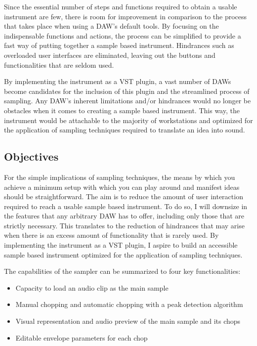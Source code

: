 \documentclass[12pt, a4paper, hidelinks]{article}
\begin{document}
	Since the essential number of steps and functions required to obtain a usable instrument are few, there is room for improvement in comparison to the process that takes place when using a DAW's default tools. By focusing on the indispensable functions and actions, the process can be simplified to provide a fast way of putting together a sample based instrument. Hindrances such as overloaded user interfaces are eliminated, leaving out the buttons and functionalities that are seldom used. \par
	
	By implementing the instrument as a VST plugin, a vast number of DAWs become candidates for the inclusion of this plugin and the streamlined process of sampling. Any DAW's inherent limitations and/or hindrances would no longer be obstacles when it comes to creating a sample based instrument. This way, the instrument would be attachable to the majority of workstations and optimized for the application of sampling techniques required to translate an idea into sound.
	  

	
	
	

	\newpage
	\subsection{Objectives}
	For the simple implications of sampling techniques, the means by which you achieve a minimum setup with which you can play around and manifest ideas should be straightforward. The aim is to reduce the amount of user interaction required to reach a usable sample based instrument. To do so, I will downsize in the features that any arbitrary DAW has to offer, including only those that are strictly necessary. This translates to the reduction of hindrances that may arise when there is an excess amount of functionality that is rarely used.  By implementing the instrument as a VST plugin, I aspire to build an accessible sample based instrument optimized for the application  of sampling techniques. %
	\par
	The capabilities of the sampler can be summarized to four key functionalities:
	\begin{itemize}
		\item Capacity to load an audio clip as the main sample                     %
		\item Manual chopping and automatic chopping with a peak detection algorithm
		\item Visual representation and audio preview of the main sample and its chops
		\item Editable envelope parameters for each chop                            %
	\end{itemize}
\end{document}
